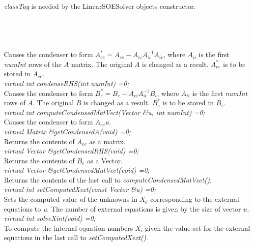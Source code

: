   \\
  \\
{\em classTag} is needed by the LinearSOESolver objects constructor. \\

 \\
\\ 

  \\
 \\
Causes the condenser to form $A_{ee}^* = A_{ee} -A_{ei} A_{ii}^{-1} A_{ie}$, where
$A_{ii}$ is the first {\em numInt} rows of the $A$ matrix.  The
original $A$ is changed as a result. $A_{ee}^*$ is to be stored in $A_{ee}$. \\

{\em virtual int condenseRHS(int numInt) =0;} \\
Causes the condenser to form $B_e^* = B_e - A_{ei} A_{ii}^{-1} B_i$, where $A_{ii}$ 
is the first {\em numInt} rows of $A$. The original $B$ is changed as a result. 
$B_e^*$ is to be stored in $B_e$. \\

{\em virtual int computeCondensedMatVect(Vector \&u, int numInt) =0;} \\
Causes the condenser to form $A_{ee} u$. \\

{\em virtual Matrix \&getCondensedA(void) =0;} \\
Returns the contents of $A_{ee}$ as a matrix. \\

{\em virtual Vector \&getCondensedRHS(void) =0;} \\
Returns the contents of $B_e$ as a Vector. \\

{\em virtual Vector \&getCondensedMatVect(void) =0;} \\
Returns the contents of the last call to {\em
computeCondensedMatVect()}. \\

{\em virtual int setComputedXext(const Vector \&u) =0;} \\
Sets the computed value of the unknowns in $X_e$ corresponding to the
external equations to {\em u}. The number of external equations is
given by the size of vector $u$.\\

{\em  virtual int solveXint(void) =0;} \\
To compute the internal equation numbers $X_i$ given the value set
for the external equations in the last call to {\em setComputedXext()}. \\


